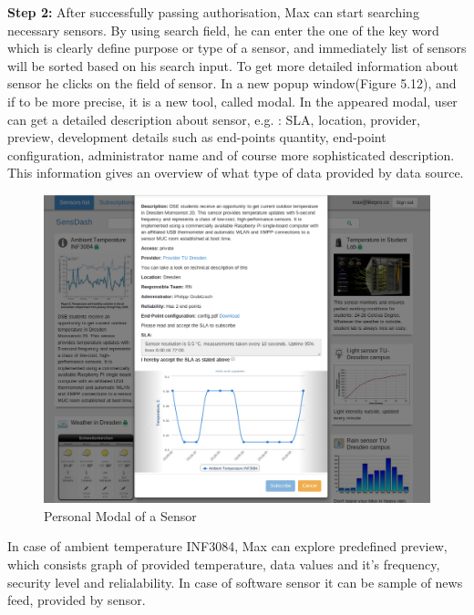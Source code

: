 \textbf{Step 2:} After successfully passing authorisation, Max can start searching necessary sensors. By using search field, he can enter the one of the key word which is clearly define purpose or type of a sensor, and immediately list of sensors will be sorted based on his search input. To get more detailed information about sensor he clicks on the field of sensor. In a new popup window(Figure 5.12), and if to be more precise, it is a new tool, called modal. In the appeared modal, user can get a detailed description about sensor, e.g. : SLA, location, provider, preview, development details such as end-points quantity, end-point configuration, administrator name and of course more sophisticated description. This information gives an overview of what type of data provided by data source. 
\begin{figure}[!ht]
\centering
\includegraphics[scale=0.6]{Screenshots/UseCaseWelcome.png}   
\caption[Personal Modal of a Sensor]{Personal Modal of a Sensor}                         
\end{figure}
 
 In case of ambient temperature INF3084, Max can explore predefined preview, which consists graph of provided temperature, data values and it's frequency, security level and relialability. In case of software sensor it can be sample of news feed, provided by sensor. 

